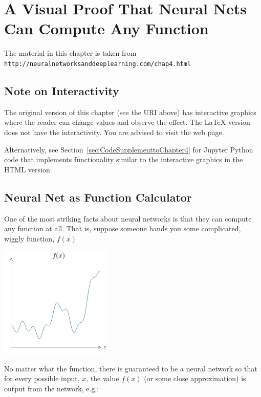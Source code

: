
\chapter{A Visual Proof That Neural Nets Can Compute Any Function}
\label{sec:AVisualProofThatNeuralNetsCanComputeAnyFunction}

The material in this chapter is taken from\\
\lstinline{http://neuralnetworksanddeeplearning.com/chap4.html}

\section*{Note on Interactivity}

The original version of this chapter (see the URI above) has interactive graphics where the reader can change values and observe the effect. The \LaTeX{} version does not have the interactivity. You are advised to visit the web page.  

Alternatively, see Section~\ref{sec:CodeSupplementtoChapter4} for Jupyter Python code that implements functionality similar to the interactive graphics in the HTML version.

\section{Neural Net as Function Calculator}

One of the most striking facts about neural networks is that they can compute any function at all. That is, suppose someone hands you some complicated, wiggly function, $f(x)$

{\centering \includegraphics[width=0.4\textwidth,]{pic/wigglyfn01.png} \par}

No matter what the function, there is guaranteed to be a neural network so that for every possible input, $x$, the value $f(x)$ (or some close approximation) is output from the network, e.g.:

